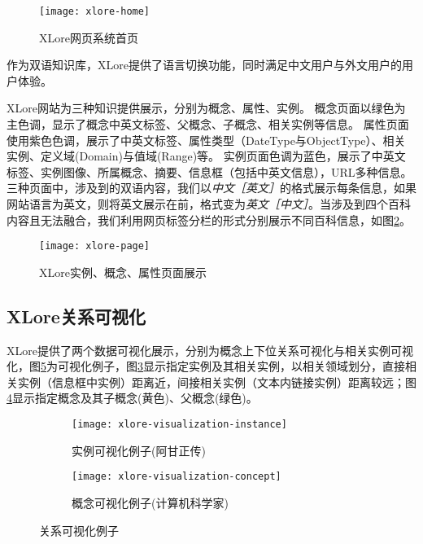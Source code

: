 \begin{figure}[H]
  \centering
  \texttt{[image: xlore-home]}
  \caption{XLore网页系统首页}
  \label{fig:xlore-home}
\end{figure}

作为双语知识库，XLore提供了语言切换功能，同时满足中文用户与外文用户的用户体验。

XLore网站为三种知识提供展示，分别为概念、属性、实例。
概念页面以绿色为主色调，显示了概念中英文标签、父概念、子概念、相关实例等信息。
属性页面使用紫色色调，展示了中英文标签、属性类型（DateType与ObjectType）、相关实例、定义域(Domain)与值域(Range)等。
实例页面色调为蓝色，展示了中英文标签、实例图像、所属概念、摘要、信息框（包括中英文信息），URL多种信息。三种页面中，涉及到的双语内容，我们以\textit{中文［英文］}的格式展示每条信息，如果网站语言为英文，则将英文展示在前，格式变为\textit{英文［中文］}。当涉及到四个百科内容且无法融合，我们利用网页标签分栏的形式分别展示不同百科信息，如图\ref{fig:xlore-page}。

\begin{figure}[H]
  \centering
  \texttt{[image: xlore-page]}
  \caption{XLore实例、概念、属性页面展示}
  \label{fig:xlore-page}
\end{figure}

\subsection{XLore关系可视化}

XLore提供了两个数据可视化展示，分别为概念上下位关系可视化与相关实例可视化，图\ref{fig:xlore-visualization}为可视化例子，图\ref{fig:xlore-visualization-instance}显示指定实例及其相关实例，以相关领域划分，直接相关实例（信息框中实例）距离近，间接相关实例（文本内链接实例）距离较远；图\ref{fig:xlore-visualization-concept}显示指定概念及其子概念(黄色)、父概念(绿色)。

\begin{figure}[H]
  \centering
  \begin{subfigure}{7.2cm}
    \texttt{[image: xlore-visualization-instance]}
    \caption{实例可视化例子(阿甘正传)}
  \label{fig:xlore-visualization-instance}
  \end{subfigure}
  \hspace{0.01cm}%
  \begin{subfigure}{7.2cm}
    \texttt{[image: xlore-visualization-concept]}
    \caption{概念可视化例子(计算机科学家)}
  \label{fig:xlore-visualization-concept}
  \end{subfigure}
  \caption{关系可视化例子}
  \label{fig:xlore-visualization}
\end{figure}

